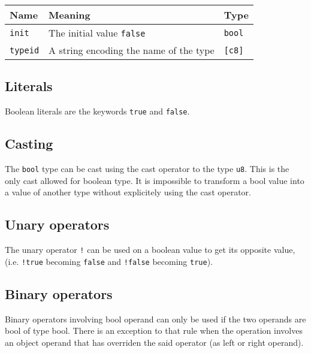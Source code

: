 \begin{center}
  \vspace{-5pt}
  \begin{adjustbox}{max width=\linewidth}
    \begin{tabular}{|l|ll|}
      \hline
      Name & Meaning & Type\\[0pt]
      \hline
      \hline
      \texttt{init} & The initial value \texttt{false} & \texttt{bool}\\[0pt]
      \hline
      \texttt{typeid} & A string encoding the name of the type & \texttt{[c8]}\\[0pt]
      \hline
    \end{tabular}
  \end{adjustbox}
\end{center}

\subsection{Literals}
\label{sec:org7620b9c}

Boolean literals are the keywords \texttt{true} and \texttt{false}.

\subsection{Casting}
\label{sec:org7cd1f94}

The \texttt{bool} type can be cast using the cast operator to the type \texttt{u8}. This is
the only cast allowed for boolean type. It is impossible to transform a bool
value into a value of another type without explicitely using the cast operator.

\subsection{Unary operators}
\label{sec:orgb412ce4}

The unary operator \texttt{!} can be used on a boolean value to get its opposite value,
(i.e. \texttt{!true} becoming \texttt{false} and \texttt{!false} becoming \texttt{true}).

\subsection{Binary operators}
\label{sec:org030ae50}

Binary operators involving bool operand can only be used if the two operands are
bool of type bool. There is an exception to that rule when the operation
involves an object operand that has overriden the said operator (as left or
right operand).

